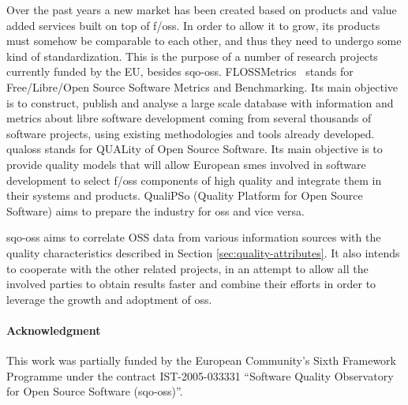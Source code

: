 \documentclass{llncs}
\begin{document}
Over the past years a new market has been created based on products and value
added services built on top of {\sc f/oss}. In order to allow it to grow, its
products must somehow be comparable to each other, and thus they need to undergo 
some kind of standardization. This is the purpose of a number of research
projects currently funded by the EU, besides {\sc sqo-oss}.
FLOSSMetrics~\cite{FLOS06} stands for Free/Libre/Open Source Software Metrics
and Benchmarking. Its main objective is to construct, publish and analyse a large
scale database with information and metrics about libre software development coming
from several thousands of software projects, using existing methodologies and
tools already developed. {\sc qualoss} stands for {QUAL}ity of Open Source
Software. Its main objective is to provide quality models that will allow
European {\sc sme}s involved in software development to select {\sc f/oss} components
of high quality and integrate them in their systems and products. Quali{PS}o
(Quality Platform for Open Source Software) aims to prepare the industry for
{\sc oss} and vice versa.

{\sc sqo-oss} aims to correlate {\sc OSS} data from various information sources
with the quality characteristics described in Section \ref{sec:quality-attributes}. It
also intends to cooperate with the other related projects, in an attempt to
allow all the involved parties to obtain results faster and combine their
efforts in order to leverage the growth and adoptment of {\sc oss}.

\paragraph*{Acknowledgment} 
This work was partially funded by the European Community's Sixth Framework 
Programme under the contract IST-2005-033331 ``Software Quality Observatory for 
Open Source Software ({\sc sqo-oss})''. 



\end{document}
